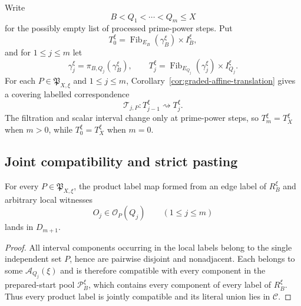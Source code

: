 Write
\[
B<Q_1<\cdots<Q_m\le X
\]
for the possibly empty list of processed prime-power steps.  Put
\[
T_0^\xi
=\operatorname{Fib}_{E_B}(\gamma_B^\xi)\times I_B^\xi,
\]
and for $1\le j\le m$ let
\[
\gamma_j^\xi=\pi_{B,Q_j}(\gamma_B^\xi),
\qquad
T_j^\xi
=\operatorname{Fib}_{E_{Q_j}}(\gamma_j^\xi)\times I_{Q_j}^\xi.
\]
For each $P\in\mathfrak P_{X,\xi}$ and $1\le j\le m$, Corollary~\ref{cor:graded-affine-translation} gives a covering labelled correspondence
\begin{equation}\label{eq:physical-local-translation-chain}
\mathscr T_{j,P}:T_{j-1}^\xi\rightsquigarrow T_j^\xi.
\end{equation}
The filtration and scalar interval change only at prime-power steps, so $T_m^\xi=T_X^\xi$ when $m>0$, while $T_0^\xi=T_X^\xi$ when $m=0$.

\subsection{Joint compatibility and strict pasting}

\begin{lemma}\label{lem:joint-compatibility}
For every $P\in\mathfrak P_{X,\xi}$, the product label map formed from an edge label of $R_B^\xi$ and arbitrary local witnesses
\[
O_j\in\mathscr O_P(Q_j)
\qquad(1\le j\le m)
\]
lands in $D_{m+1}$.
\end{lemma}

\begin{proof}
All interval components occurring in the local labels belong to the single independent set $P$, hence are pairwise disjoint and nonadjacent.  Each belongs to some $\mathcal A_{Q_j}(\xi)$ and is therefore compatible with every component in the prepared-start pool $\mathscr P_B^\xi$, which contains every component of every label of $R_B^\xi$.  Thus every product label is jointly compatible and its literal union lies in $\mathcal C$.
\end{proof}


